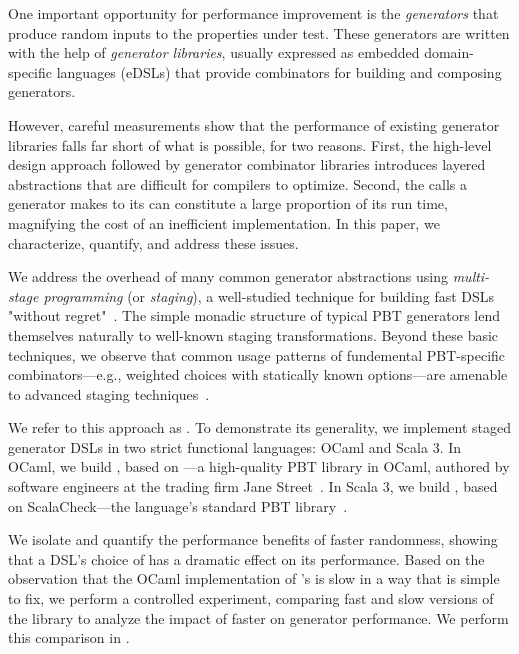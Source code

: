 \documentclass[acmsmall]{acmart}
\theoremstyle{definition}
\begin{document}
One important opportunity for performance improvement
is the \textit{generators} that produce random inputs to the properties under
test. These generators are written with the help of \textit{generator
libraries}, usually expressed as embedded domain-specific languages (eDSLs)
that provide combinators for building and composing generators.

However, careful
measurements show that the performance of existing generator libraries falls far short of what
is possible,
for two reasons.
%
First, the high-level design approach followed by generator combinator
libraries introduces layered abstractions  that are difficult for
compilers to optimize.
Second, the calls a generator makes to its \rand{} can constitute a large
proportion of its run time, magnifying the cost of an inefficient
implementation.
%
In this paper, we characterize, quantify, and address these issues.

%
We address the overhead of
many common generator abstractions using \textit{multi-stage
  programming} (or {\em staging}), a well-studied technique for
building fast DSLs "without regret"~\cite{lms}. 
%
The simple monadic structure of typical PBT generators lend themselves naturally
to well-known staging transformations. Beyond these basic techniques, we observe
that common usage patterns of fundemental PBT-specific combinators---e.g., weighted choices with statically known options---are amenable
to advanced staging techniques~\cite{partially-static,kovacs24, carrette05}.


We refer to this approach as \name.
To demonstrate its generality, we implement staged generator DSLs in
two strict functional languages: OCaml and Scala 3.  In OCaml, we
build \camlname{}, based on \bq{}---a high-quality PBT library in
OCaml, authored by software engineers at the trading firm Jane Street~\cite{bq}.  In Scala 3, we build \scalaname{}, based on ScalaCheck---the
language's standard PBT library~\cite{sc}.

We isolate and quantify the performance benefits of faster randomness, showing
that a DSL's choice of \rand{} has a dramatic effect on its performance. Based
on the observation that the OCaml implementation of \bq{}'s \rand{} is slow in
a way that is simple to fix, we perform a controlled experiment, comparing fast and slow
versions of the library to analyze the impact of faster \rands{} on
generator performance. We perform this comparison in \camlname{}.
\end{document}
